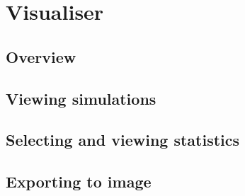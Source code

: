 \chapter{Visualiser}
\label{chap:visualiser}


\section{Overview}
\label{section:overview}


\section{Viewing simulations}
\label{section:viewing}




\section{Selecting and viewing statistics}
\label{section:stats_selection}




\section{Exporting to image}
\label{section:export_image}


